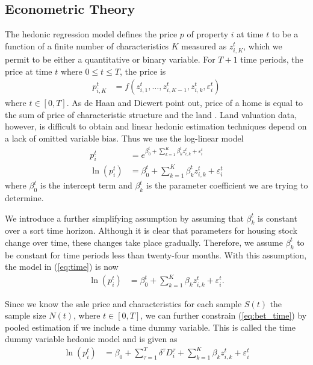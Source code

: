 \documentclass[12pt,oneside]{amsbook}
\newcommand{\eps}{\varepsilon^t_i}
\newcommand{\bet}{\beta^t}
\newcommand{\zet}{z^t}
\begin{document}
\subsection{Econometric Theory}\label{sec:metrics}
The hedonic regression model defines the price $p$ of property $i$ at time $t$ to be a function of a finite number of characteristics $K$ measured as $z_{i,K}^t$, which we permit to be either a quantitative or binary variable. For $T+1$ time periods, the price at time $t$ where $0\leq t \leq T$, the price is
\begin{align}
p^t_{i,K} &= f(z_{i,1}^t, \dots,  z_{i,K-1}^t, z_{i,k}^t, \eps)
\end{align}
where $t \in [0, T]$. As de Haan and Diewert point out, price of a home is equal to the sum of price of characteristic structure and the land \cite{Hedonic}. Land valuation data, however, is difficult to obtain and linear hedonic estimation techniques depend on a lack of omitted variable bias. Thus we use the log-linear model 
\begin{align}
 p^t_{i} & = e^{ \bet_0 + \sum^K_{k=1}\beta^t_k \zet_{i,k} + \eps}\\
\ln (p^t_{i}) & = \bet_0 + \sum^K_{k=1}\beta^t_k \zet_{i,k} + \eps \label{eq:time}
\end{align}
where $\bet_0$ is the intercept term and $\bet_k$ is the parameter coefficient we are trying to determine. 

    We introduce a further simplifying assumption by assuming that $\bet_k$ is constant over a sort time horizon. Although it is clear that parameters for housing stock change over time, these changes take place gradually. Therefore, we assume $\bet_k$ to be constant for time periods less than twenty-four months. With this assumption, the model in (\ref{eq:time}) is now 
\begin{align}
\ln (p^t_{i}) & = \bet_0 + \sum^K_{k=1}\beta_k \zet_{i,k} + \eps.\label{eq:bet_time}
\end{align}

    Since we know the sale price and characteristics for each sample $S(t)$ the sample size $N(t)$, where $t \in [0, T]$, we can further constrain (\ref{eq:bet_time}) by pooled estimation if we include a time dummy variable. This is called the time dummy variable hedonic model and is given as 
\begin{align}
\ln (p^t_{i}) & = \beta_0 + \sum^T_{\tau=1} \delta^\tau D^\tau_i+ \sum^K_{k=1}\beta_k \zet_{i,k} + \eps \label{eq:time_dummy_basic}
\end{align}
\end{document}
